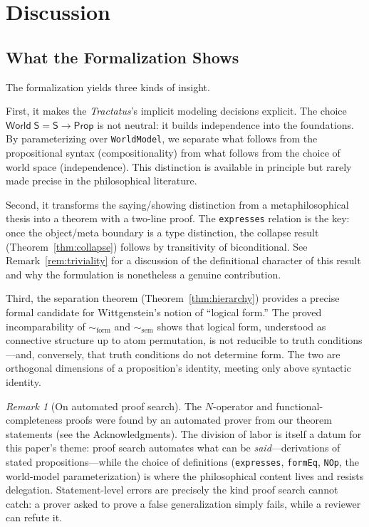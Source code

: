\documentclass[10pt, letterpaper]{article}
\theoremstyle{definition}
\theoremstyle{remark}
\newtheorem{remark}[theorem]{Remark}
\newcommand{\Sach}{\mathsf{S}}
\newcommand{\World}{\mathsf{World}}
\newcommand{\Prop}{\mathsf{Prop}}
\newcommand{\formEq}{\sim_{\mathrm{form}}}
\newcommand{\semEq}{\sim_{\mathrm{sem}}}
\begin{document}
\section{Discussion}
\label{sec:discussion}

\subsection{What the Formalization Shows}
\label{sec:shows}

The formalization yields three kinds of insight.

First, it makes the \emph{Tractatus}'s implicit modeling
decisions explicit.  The choice $\World\;\Sach = \Sach \to
\Prop$ is not neutral: it builds independence into the
foundations.  By parameterizing over \texttt{WorldModel}, we
separate what follows from the propositional syntax (compositionality)
from what follows from the choice of world space (independence).
This distinction is available in principle but rarely made
precise in the philosophical literature.

Second, it transforms the saying/showing distinction from a
metaphilosophical thesis into a theorem with a two-line proof.
The \texttt{expresses} relation is the key: once the
object/meta boundary is a type distinction, the collapse result
(Theorem~\ref{thm:collapse}) follows by transitivity of
biconditional.  See Remark~\ref{rem:triviality} for a
discussion of the definitional character of this result and
why the formulation is nonetheless a genuine contribution.

Third, the separation theorem (Theorem~\ref{thm:hierarchy})
provides a precise formal candidate for Wittgenstein's
notion of ``logical form.''  The proved incomparability of
$\formEq$ and $\semEq$ shows that logical form, understood as
connective structure up to atom permutation, is not reducible to
truth conditions---and, conversely, that truth conditions do not
determine form.  The two are orthogonal dimensions of a
proposition's identity, meeting only above syntactic identity.

\begin{remark}[On automated proof search]
\label{rem:automation}
The $N$-operator and functional-completeness proofs were found
by an automated prover from our theorem statements (see the
Acknowledgments).  The division of labor is itself a datum for
this paper's theme: proof search automates what can be
\emph{said}---derivations of stated propositions---while the
choice of definitions (\texttt{expresses}, \texttt{formEq},
\texttt{NOp}, the world-model parameterization) is where the
philosophical content lives and resists delegation.
Statement-level errors are precisely the kind proof search
cannot catch: a prover asked to prove a false generalization
simply fails, while a reviewer can refute it.
\end{remark}
\end{document}
